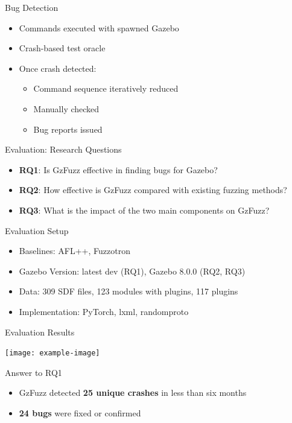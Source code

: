 \documentclass{beamer}
\begin{document}
\begin{frame}{Bug Detection}
\begin{itemize}
\item Commands executed with spawned Gazebo
\item Crash-based test oracle
\item Once crash detected:
  \begin{itemize}
  \item Command sequence iteratively reduced
  \item Manually checked
  \item Bug reports issued
  \end{itemize}
\end{itemize}
\end{frame}

\begin{frame}{Evaluation: Research Questions}
\begin{itemize}
\item \textbf{RQ1}: Is GzFuzz effective in finding bugs for Gazebo?
\item \textbf{RQ2}: How effective is GzFuzz compared with existing fuzzing methods?
\item \textbf{RQ3}: What is the impact of the two main components on GzFuzz?
\end{itemize}
\end{frame}

\begin{frame}{Evaluation Setup}
\begin{itemize}
\item Baselines: AFL++, Fuzzotron
\item Gazebo Version: latest dev (RQ1), Gazebo 8.0.0 (RQ2, RQ3)
\item Data: 309 SDF files, 123 modules with plugins, 117 plugins
\item Implementation: PyTorch, lxml, randomproto
\end{itemize}
\end{frame}

\begin{frame}{Evaluation Results}
\begin{center}
\texttt{[image: example-image]}
\end{center}
\end{frame}

\begin{frame}{Answer to RQ1}
\begin{itemize}
\item GzFuzz detected \textbf{25 unique crashes} in less than six months
\item \textbf{24 bugs} were fixed or confirmed
\end{itemize}
\end{frame}
\end{document}

